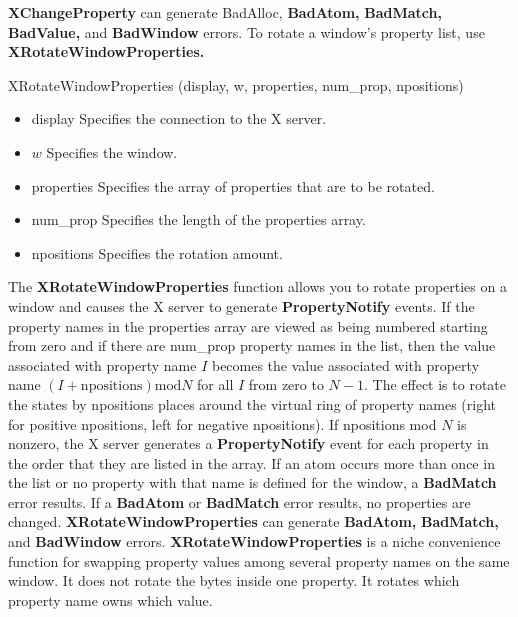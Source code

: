 \documentclass{report}
\begin{document}
\begin{itemize}
        \bigbreak \noindent 
        \textbf{XChangeProperty} can generate BadAlloc, \textbf{BadAtom,} \textbf{BadMatch,} \textbf{BadValue,} and \textbf{BadWindow} errors.
        \bigbreak \noindent 
        To rotate a window’s property list, use \textbf{XRotateWindowProperties.}
        \bigbreak \noindent 
        \begin{cppcode}
            XRotateWindowProperties (display, w, properties, num_prop, npositions)
        \end{cppcode}
        \bigbreak \noindent
        \begin{itemize}
            \item display Specifies the connection to the X server.
            \item $w$ Specifies the window.
            \item properties Specifies the array of properties that are to be rotated.
            \item num\_prop Specifies the length of the properties array.
            \item npositions Specifies the rotation amount.
        \end{itemize}
        The \textbf{XRotateWindowProperties} function allows you to rotate properties on a window and causes the X server to generate \textbf{PropertyNotify} events. If the property names in the properties array are viewed as being numbered starting from zero and if there are num\_prop property names in the list, then the value associated with property name $I$ becomes the value associated with property name $(I + \text{npositions}) \text{mod} N$ for all $I$ from zero to $N - 1$. The effect is to rotate the states by npositions places around the virtual ring of property names (right for positive npositions, left for negative npositions). If npositions mod $N$ is nonzero, the X server generates a \textbf{PropertyNotify} event for each property in the order that they are listed in the array. If an atom occurs more than once in the list or no property with that name is defined for the window, a \textbf{BadMatch} error results. If a \textbf{BadAtom} or \textbf{BadMatch} error results, no properties are changed.
        \bigbreak \noindent 
        \textbf{XRotateWindowProperties} can generate \textbf{BadAtom,} \textbf{BadMatch,} and \textbf{BadWindow} errors.
        \bigbreak \noindent 
        \textbf{XRotateWindowProperties} is a niche convenience function for swapping property values among several property names on the same window.
        \bigbreak \noindent 
        It does not rotate the bytes inside one property. It rotates which property name owns which value.

\end{itemize}
\end{document}

